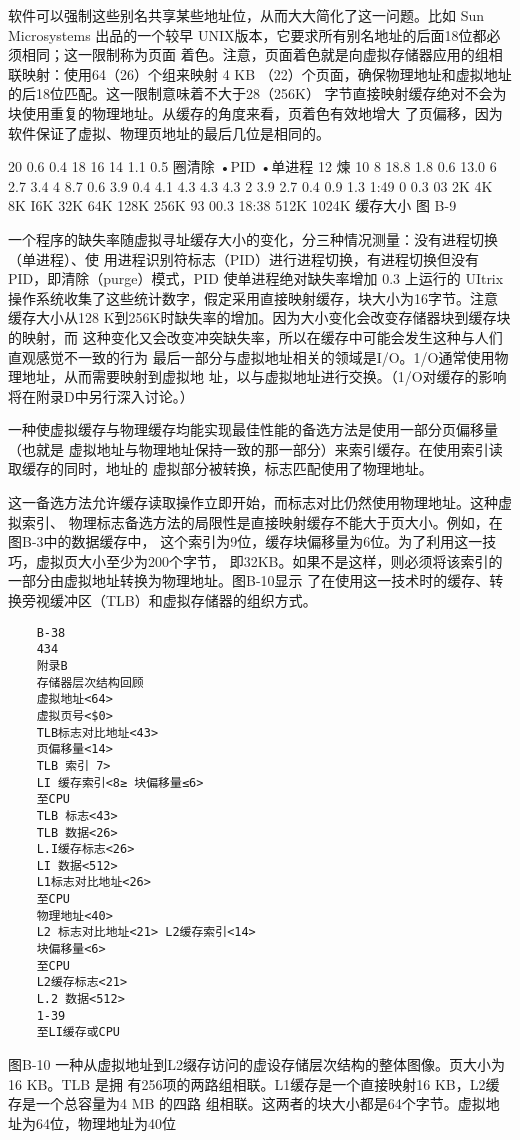 软件可以强制这些别名共享某些地址位，从而大大简化了这一问题。比如 Sun Microsystems
出品的一个较早 UNIX版本，它要求所有别名地址的后面18位都必须相同；这一限制称为页面
着色。注意，页面着色就是向虚拟存储器应用的组相联映射：使用64（26）个组来映射 4 KB
（22）个页面，确保物理地址和虚拟地址的后18位匹配。这一限制意味着不大于28（256K）
字节直接映射缓存绝对不会为块使用重复的物理地址。从缓存的角度来看，页着色有效地增大
了页偏移，因为软件保证了虚拟、物理页地址的最后几位是相同的。

20%
0.6%
0.4%
18%
16%
14%
1.1%
0.5%
圈清除
•PID
•单进程
12%
煉 10%
8%
18.8%
1.8%
0.6%
13.0%
6%
2.7%
3.4%
4%
8.7%
0.6%
3.9%
0.4%
4.1%
4.3%
4.3%
4.3%
2%
3.9%
2.7%
0.4%
0.9%
1.3%
1:49
0%
0.3%
03%
2K
4K
8K
I6K
32K
64K
128K
256K
93%
00.3%
18:38
512K 1024K
缓存大小
图 B-9

一个程序的缺失率随虚拟寻址缓存大小的变化，分三种情况测量：没有进程切换（单进程）、使
用进程识别符标志（PID）进行进程切换，有进程切换但没有 PID，即清除（purge）模式，PID
使单进程绝对缺失率增加 0.3%
上运行的 UItrix 操作系统收集了这些统计数字，假定采用直接映射缓存，块大小为16字节。注意
缓存大小从128 K到256K时缺失率的增加。因为大小变化会改变存储器块到缓存块的映射，而
这种变化又会改变冲突缺失率，所以在缓存中可能会发生这种与人们直观感觉不一致的行为
最后一部分与虚拟地址相关的领域是I/O。1/O通常使用物理地址，从而需要映射到虚拟地
址，以与虚拟地址进行交换。（1/O对缓存的影响将在附录D中另行深入讨论。）

一种使虚拟缓存与物理缓存均能实现最佳性能的备选方法是使用一部分页偏移量（也就是
虚拟地址与物理地址保持一致的那一部分）来索引缓存。在使用索引读取缓存的同时，地址的
虚拟部分被转换，标志匹配使用了物理地址。

这一备选方法允许缓存读取操作立即开始，而标志对比仍然使用物理地址。这种虚拟索引、
物理标志备选方法的局限性是直接映射缓存不能大于页大小。例如，在图B-3中的数据缓存中，
这个索引为9位，缓存块偏移量为6位。为了利用这一技巧，虚拟页大小至少为200个字节，
即32KB。如果不是这样，则必须将该索引的一部分由虚拟地址转换为物理地址。图B-10显示
了在使用这一技术时的缓存、转换旁视缓冲区（TLB）和虚拟存储器的组织方式。

\begin{verbatim}
    B-38
    434
    附录B
    存储器层次结构回顾
    虚拟地址<64>
    虚拟页号<$0>
    TLB标志对比地址<43>
    页偏移量<14>
    TLB 索引 7>
    LI 缓存索引<8≥ 块偏移量≤6>
    至CPU
    TLB 标志<43>
    TLB 数据<26>
    L.I缓存标志<26>
    LI 数据<512>
    L1标志对比地址<26>
    至CPU
    物理地址<40>
    L2 标志对比地址<21> L2缓存索引<14>
    块偏移量<6>
    至CPU
    L2缓存标志<21>
    L.2 数据<512>
    1-39
    至LI缓存或CPU
\end{verbatim}
图B-10 一种从虚拟地址到L2缀存访问的虚设存储层次结构的整体图像。页大小为16 KB。TLB 是拥
有256项的两路组相联。L1缓存是一个直接映射16 KB，L2缓存是一个总容量为4 MB 的四路
组相联。这两者的块大小都是64个字节。虚拟地址为64位，物理地址为40位

